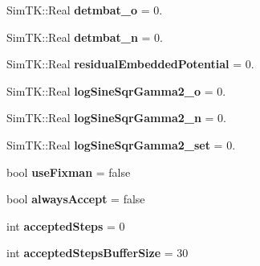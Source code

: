 \begin{DoxyCompactItemize}
\item 
Sim\+T\+K\+::\+Real {\bfseries detmbat\+\_\+o} = 0.\hypertarget{classMonteCarloSampler_aa6ab3bf81da9dd54c0df1afbb92c94d5}{}\label{classMonteCarloSampler_aa6ab3bf81da9dd54c0df1afbb92c94d5}

\item 
Sim\+T\+K\+::\+Real {\bfseries detmbat\+\_\+n} = 0.\hypertarget{classMonteCarloSampler_a1c11d5fd863c257f32ab142b7e65648b}{}\label{classMonteCarloSampler_a1c11d5fd863c257f32ab142b7e65648b}

\item 
Sim\+T\+K\+::\+Real {\bfseries residual\+Embedded\+Potential} = 0.\hypertarget{classMonteCarloSampler_a1c6167653e0d2fa65057a6a4793faea1}{}\label{classMonteCarloSampler_a1c6167653e0d2fa65057a6a4793faea1}

\item 
Sim\+T\+K\+::\+Real {\bfseries log\+Sine\+Sqr\+Gamma2\+\_\+o} = 0.\hypertarget{classMonteCarloSampler_a451404c5869285d32047cd8070f31dc3}{}\label{classMonteCarloSampler_a451404c5869285d32047cd8070f31dc3}

\item 
Sim\+T\+K\+::\+Real {\bfseries log\+Sine\+Sqr\+Gamma2\+\_\+n} = 0.\hypertarget{classMonteCarloSampler_aad0a503a222d06dafd504bbd6c4c2d4a}{}\label{classMonteCarloSampler_aad0a503a222d06dafd504bbd6c4c2d4a}

\item 
Sim\+T\+K\+::\+Real {\bfseries log\+Sine\+Sqr\+Gamma2\+\_\+set} = 0.\hypertarget{classMonteCarloSampler_a2c9848636e1842bbeb0a5e86dd039007}{}\label{classMonteCarloSampler_a2c9848636e1842bbeb0a5e86dd039007}

\item 
bool {\bfseries use\+Fixman} = false\hypertarget{classMonteCarloSampler_a202a86fee8c6c766d68d4a6d44918ebf}{}\label{classMonteCarloSampler_a202a86fee8c6c766d68d4a6d44918ebf}

\item 
bool {\bfseries always\+Accept} = false\hypertarget{classMonteCarloSampler_a1deab6aec5c368a516afced6dc87b001}{}\label{classMonteCarloSampler_a1deab6aec5c368a516afced6dc87b001}

\item 
int {\bfseries accepted\+Steps} = 0\hypertarget{classMonteCarloSampler_ac2b9df435ba70cedd43406dc66d691b7}{}\label{classMonteCarloSampler_ac2b9df435ba70cedd43406dc66d691b7}

\item 
int {\bfseries accepted\+Steps\+Buffer\+Size} = 30\hypertarget{classMonteCarloSampler_a25ebd711aad3d3be594978679a292805}{}\label{classMonteCarloSampler_a25ebd711aad3d3be594978679a292805}


\end{DoxyCompactItemize}
